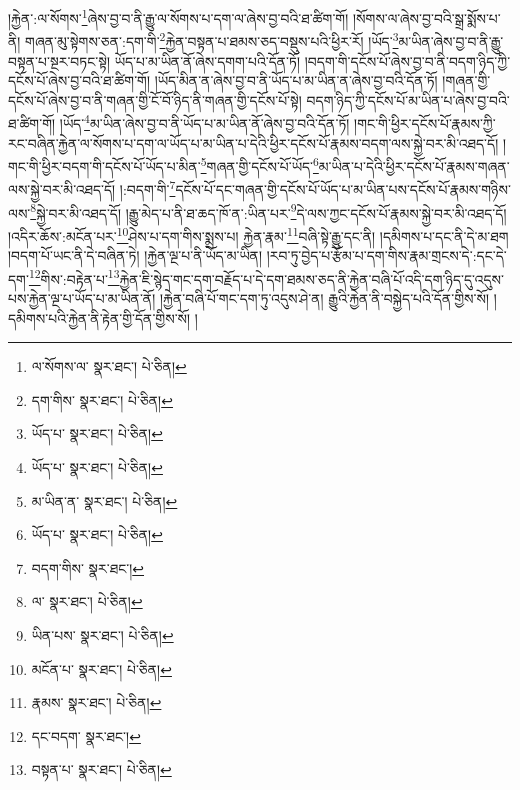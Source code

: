 །རྐྱེན་:ལ་སོགས་\footnote{ལ་སོགས་ལ་  སྣར་ཐང་།  པེ་ཅིན། }ཞེས་བྱ་བ་ནི་རྒྱུ་ལ་སོགས་པ་དག་ལ་ཞེས་བྱ་བའི་ཐ་ཚིག་གོ། །སོགས་ལ་ཞེས་བྱ་བའི་སྒྲ་སྨོས་པ་ནི། གཞན་མུ་སྟེགས་ཅན་:དག་གི་\footnote{དག་གིས་  སྣར་ཐང་།  པེ་ཅིན། }རྐྱེན་བསྟན་པ་ཐམས་ཅད་བསྡུས་པའི་ཕྱིར་རོ། །ཡོད་\footnote{ཡོད་པ་  སྣར་ཐང་།  པེ་ཅིན། }མ་ཡིན་ཞེས་བྱ་བ་ནི་རྒྱུ་བསྟན་པ་སྔར་བཏང་སྟེ། ཡོད་པ་མ་ཡིན་ནོ་ཞེས་དགག་པའི་དོན་ཏོ། །བདག་གི་དངོས་པོ་ཞེས་བྱ་བ་ནི་བདག་ཉིད་ཀྱི་དངོས་པོ་ཞེས་བྱ་བའི་ཐ་ཚིག་གོ། །ཡོད་མིན་ན་ཞེས་བྱ་བ་ནི་ཡོད་པ་མ་ཡིན་ན་ཞེས་བྱ་བའི་དོན་ཏོ། །གཞན་གྱི་དངོས་པོ་ཞེས་བྱ་བ་ནི་གཞན་གྱི་ངོ་བོ་ཉིད་ནི་གཞན་གྱི་དངོས་པོ་སྟེ། བདག་ཉིད་ཀྱི་དངོས་པོ་མ་ཡིན་པ་ཞེས་བྱ་བའི་ཐ་ཚིག་གོ། །ཡོད་\footnote{ཡོད་པ་  སྣར་ཐང་།  པེ་ཅིན། }མ་ཡིན་ཞེས་བྱ་བ་ནི་ཡོད་པ་མ་ཡིན་ནོ་ཞེས་བྱ་བའི་དོན་ཏོ། །གང་གི་ཕྱིར་དངོས་པོ་རྣམས་ཀྱི་རང་བཞིན་རྐྱེན་ལ་སོགས་པ་དག་ལ་ཡོད་པ་མ་ཡིན་པ་དེའི་ཕྱིར་དངོས་པོ་རྣམས་བདག་ལས་སྐྱེ་བར་མི་འཐད་དོ། །གང་གི་ཕྱིར་བདག་གི་དངོས་པོ་ཡོད་པ་མིན་\footnote{མ་ཡིན་ན་  སྣར་ཐང་།  པེ་ཅིན། }གཞན་གྱི་དངོས་པོ་ཡོད་\footnote{ཡོད་པ་  སྣར་ཐང་།  པེ་ཅིན། }མ་ཡིན་པ་དེའི་ཕྱིར་དངོས་པོ་རྣམས་གཞན་ལས་སྐྱེ་བར་མི་འཐད་དོ། །:བདག་གི་\footnote{བདག་གིས་  སྣར་ཐང་། }དངོས་པོ་དང་གཞན་གྱི་དངོས་པོ་ཡོད་པ་མ་ཡིན་པས་དངོས་པོ་རྣམས་གཉིས་ལས་\footnote{ལ་  སྣར་ཐང་།  པེ་ཅིན། }སྐྱེ་བར་མི་འཐད་དོ། །རྒྱུ་མེད་པ་ནི་ཐ་ཆད་ཁོ་ན་:ཡིན་པར་\footnote{ཡིན་པས་  སྣར་ཐང་།  པེ་ཅིན། }དེ་ལས་ཀྱང་དངོས་པོ་རྣམས་སྐྱེ་བར་མི་འཐད་དོ། །འདིར་ཆོས་:མངོན་པར་\footnote{མངོན་པ་  སྣར་ཐང་།  པེ་ཅིན། }ཤེས་པ་དག་གིས་སྨྲས་པ། རྐྱེན་རྣམ་\footnote{རྣམས་  སྣར་ཐང་།  པེ་ཅིན། }བཞི་སྟེ་རྒྱུ་དང་ནི། །དམིགས་པ་དང་ནི་དེ་མ་ཐག །བདག་པོ་ཡང་ནི་དེ་བཞིན་ཏེ། །རྐྱེན་ལྔ་པ་ནི་ཡོད་མ་ཡིན། །རབ་ཏུ་བྱེད་པ་རྩོམ་པ་དག་གིས་རྣམ་གྲངས་དེ་:དང་དེ་དག་\footnote{དང་བདག་  སྣར་ཐང་། }གིས་:བརྟེན་པ་\footnote{བསྟན་པ་  སྣར་ཐང་།  པེ་ཅིན། }རྐྱེན་ཇི་སྙེད་གང་དག་བརྗོད་པ་དེ་དག་ཐམས་ཅད་ནི་རྐྱེན་བཞི་པོ་འདི་དག་ཉིད་དུ་འདུས་པས་རྐྱེན་ལྔ་པ་ཡོད་པ་མ་ཡིན་ནོ། །རྐྱེན་བཞི་པོ་གང་དག་ཏུ་འདུས་ཤེ་ན། རྒྱུའི་རྐྱེན་ནི་བསྐྱེད་པའི་དོན་གྱིས་སོ། །དམིགས་པའི་རྐྱེན་ནི་རྟེན་གྱི་དོན་གྱིས་སོ། །

